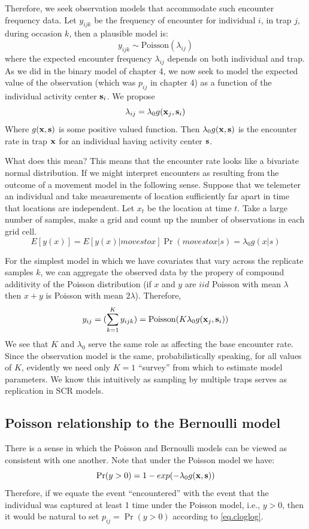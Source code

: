 Therefore, we seek observation models that accommodate such encounter
frequency data.  Let $y_{ijk}$ be the frequency of encounter for
individual $i$, in trap $j$, during occasion $k$, then a plausible
model is:
\[
 y_{ijk} \sim \mbox{Poisson}(\lambda_{ij})
\]
where the expected encounter frequency $\lambda_{ij}$ depends on both
individual and trap. As we did in the binary model of chapter 4, we
now seek to model the expected value of the observation (which was
$p_{ij}$ in chapter 4) as a function of the individual activity center
${\bf s}_{i}$.
We propose 
\[
 \lambda_{ij} = \lambda_{0}  g({\bf x}_{j},{\bf s}_{i})
\]
Where $g({\bf x},{\bf s})$ is some positive valued function. 
Then $\lambda_{0}g({\bf x},{\bf s})$ is the encounter rate in trap
${\bf x}$ for an individual having activity center ${\bf s}$.  

What does this mean? This means that the encounter rate looks like a
bivariate normal distribution.  If we might interpret encounters as
resulting from the outcome of a movement model in the following
sense. Suppose that we telemeter an individual and take measurements
of location sufficiently far apart in time that locations are
independent. Let $x_{t}$ be the location at time $t$. Take a large
number of samples, make a grid and count up the number of observations
in each grid cell.
\[
 E[y(x)] = E[y(x)| moves to x]\Pr(moves to x|s) = \lambda_{0} g(x|s)
\]


For the simplest model in which we have covariates that vary across
the replicate samples $k$, we can aggregate the observed data by the
propery of compound additivity of the Poisson distribution (if $x$ and
$y$ are $iid$ Poisson with mean $\lambda$ then $x+y$ is Poisson with
mean $2\lambda$). Therefore,
\[
y_{ij} = (\sum_{k=1}^{K} y_{ijk}) =  \mbox{Poisson}(K  \lambda_{0} 
g({\bf x}_{j},{\bf s}_{i}) )
\]
We see that $K$ and $\lambda_{0}$ serve the same role as affecting the
base encounter rate. Since the observation model is the same,
probabilistically speaking, for all values of $K$, evidently we need
only $K=1$ ``survey'' from which to estimate model parameters. We know
this intuitively as sampling by multiple traps serves as replication
in SCR models.


\subsection{Poisson relationship to the Bernoulli model}

There is a sense in which the Poisson and Bernoulli models can
be viewed as consistent with one another. Note that under the Poisson
model we have:
\begin{equation}
 \Pr(y>0) = 1-exp(-\lambda_{0} g({\bf x},{\bf s}))
\label{eq.cloglog}
\end{equation}
Therefore, 
if we equate the event ``encountered'' with the event that the
individual was captured at least 1 time under the Poisson model, i.e., $y>0$, then it would be
natural to set $p_{ij} = \Pr(y>0)$ according to \ref{eq.cloglog}. 

